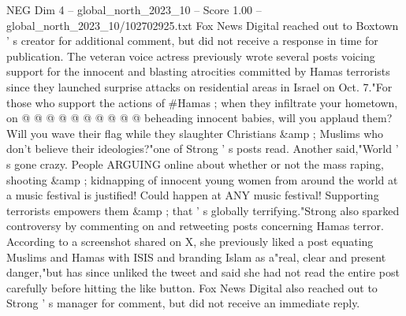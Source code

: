 \begin{textsample}{NEG Dim 4 – global\_north\_2023\_10 – Score 1.00 – global\_north\_2023\_10/102702925.txt}
Fox News Digital reached out to Boxtown ' s creator for additional comment, but did not receive a response in time for publication.
The veteran voice actress previously wrote several posts voicing support for the innocent and blasting atrocities committed by Hamas terrorists since they launched surprise attacks on residential areas in Israel on Oct. 7."For those who support the actions of \#Hamas ; when they infiltrate your hometown, on @ @ @ @ @ @ @ @ @ @ beheading innocent babies, will you applaud them?
Will you wave their flag while they slaughter Christians \&amp ; Muslims who don't believe their ideologies?"one of Strong ' s posts read.
Another said,"World ' s gone crazy.
People ARGUING online about whether or not the mass raping, shooting \&amp ; kidnapping of innocent young women from around the world at a music festival is justified!
Could happen at ANY music festival!
Supporting terrorists empowers them \&amp ; that ' s globally terrifying."Strong also sparked controversy by commenting on and retweeting posts concerning Hamas terror.
According to a screenshot shared on X, she previously liked a post equating Muslims and Hamas with ISIS and branding Islam as a"real, clear and present danger,"but has since unliked the tweet and said she had not read the entire post carefully before hitting the like button.
Fox News Digital also reached out to Strong ' s manager for comment, but did not receive an immediate reply.

\end{textsample}
